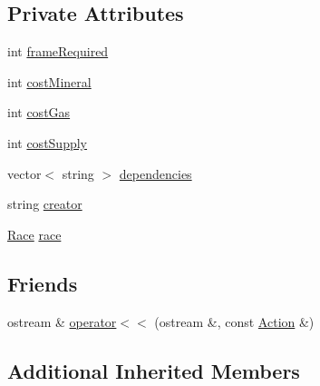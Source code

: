 \subsection*{Private Attributes}
\begin{DoxyCompactItemize}
\item 
int \hyperlink{classghost_1_1Action_a9b440d6806597b8f87f342a03fcaa39f}{frame\-Required}
\item 
int \hyperlink{classghost_1_1Action_abc5c6f31a411189a0dbd57a42e20c723}{cost\-Mineral}
\item 
int \hyperlink{classghost_1_1Action_a19015ea4ddcabea95f610b1a5450b3a0}{cost\-Gas}
\item 
int \hyperlink{classghost_1_1Action_ac804f6d585c2b9df3bc9809539f72db3}{cost\-Supply}
\item 
vector$<$ string $>$ \hyperlink{classghost_1_1Action_a0e7e5f84cc8d24bed8d83021602b02c2}{dependencies}
\item 
string \hyperlink{classghost_1_1Action_ab4862cbb4a415783306abbd1a2c57472}{creator}
\item 
\hyperlink{namespaceghost_a8b1db75c40c6980adcf244ddccc0324b}{Race} \hyperlink{classghost_1_1Action_a040eaa1d69dc99221cbdf48d84ce6edb}{race}
\end{DoxyCompactItemize}
\subsection*{Friends}
\begin{DoxyCompactItemize}
\item 
ostream \& \hyperlink{classghost_1_1Action_a44b75b6ed85320c12cd00afe16e9872d}{operator$<$$<$} (ostream \&, const \hyperlink{classghost_1_1Action}{Action} \&)
\end{DoxyCompactItemize}
\subsection*{Additional Inherited Members}



